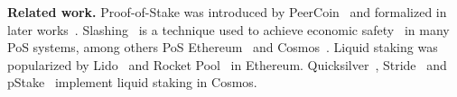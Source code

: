 \noindent
\textbf{Related work.}
Proof-of-Stake was introduced by PeerCoin~\cite{peercoin} and formalized
in later works~\cite{ouroboros,praos,ouroboros-genesis,algorand,DBLP:journals/iacr/BentovPS16a}.
Slashing~\cite{slashing} is a technique used to achieve economic safety~\cite{slashable-safety}
in many PoS systems, among others
PoS Ethereum~\cite{casper,buterin2020combining,sompolinsky2015secure,kiayias2017trees}
and
Cosmos~\cite{2018tendermint,buchman2016tendermint,cosmossdk}.
Liquid staking was popularized by Lido~\cite{lido} and Rocket Pool~\cite{rocket-pool}
in Ethereum. Quicksilver~\cite{quicksilver}, Stride~\cite{stride} and
pStake~\cite{pstake} implement liquid staking in Cosmos.

